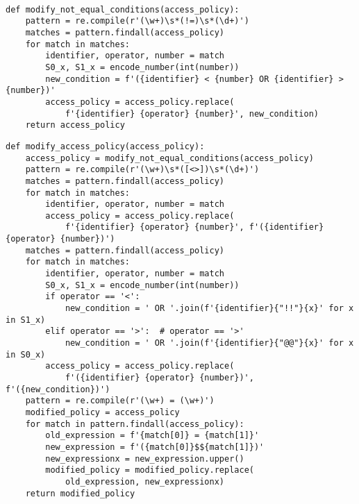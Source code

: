 \begin{lstlisting}[style=mystyle, caption={Function for implementing a!=b operator}, label=yourlabel]

def modify_not_equal_conditions(access_policy):
    pattern = re.compile(r'(\w+)\s*(!=)\s*(\d+)')
    matches = pattern.findall(access_policy)
    for match in matches:
        identifier, operator, number = match
        S0_x, S1_x = encode_number(int(number))
        new_condition = f'({identifier} < {number} OR {identifier} > {number})'
        access_policy = access_policy.replace(
            f'{identifier} {operator} {number}', new_condition)
    return access_policy
\end{lstlisting}
\begin{lstlisting}[style=mystyle, caption={Function for modifying access policy for Range comparison}, label=yourlabel]
def modify_access_policy(access_policy):
    access_policy = modify_not_equal_conditions(access_policy)
    pattern = re.compile(r'(\w+)\s*([<>])\s*(\d+)')
    matches = pattern.findall(access_policy)
    for match in matches:
        identifier, operator, number = match
        access_policy = access_policy.replace(
            f'{identifier} {operator} {number}', f'({identifier} {operator} {number})')
    matches = pattern.findall(access_policy)
    for match in matches:
        identifier, operator, number = match
        S0_x, S1_x = encode_number(int(number))
        if operator == '<':
            new_condition = ' OR '.join(f'{identifier}{"!!"}{x}' for x in S1_x)
        elif operator == '>':  # operator == '>'
            new_condition = ' OR '.join(f'{identifier}{"@@"}{x}' for x in S0_x)
        access_policy = access_policy.replace(
            f'({identifier} {operator} {number})', f'({new_condition})')
    pattern = re.compile(r'(\w+) = (\w+)')
    modified_policy = access_policy
    for match in pattern.findall(access_policy):
        old_expression = f'{match[0]} = {match[1]}'
        new_expression = f'({match[0]}$${match[1]})'
        new_expressionx = new_expression.upper()
        modified_policy = modified_policy.replace(
            old_expression, new_expressionx)
    return modified_policy
\end{lstlisting}
